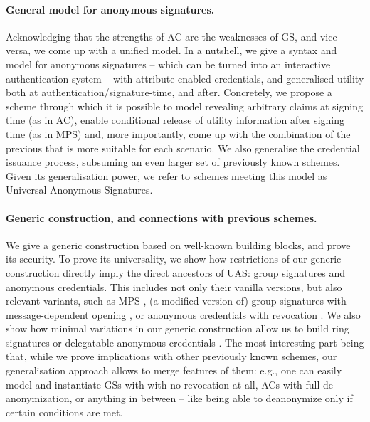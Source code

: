 \paragraph{General model for anonymous signatures.} %
Acknowledging that the strengths of AC are the weaknesses of GS, and vice versa,
we come up with a unified model. In a nutshell, we give a syntax and model for
anonymous signatures -- which can be turned into an interactive authentication
system -- with attribute-enabled credentials, and generalised utility both at
authentication/signature-time, and after. Concretely, we propose a scheme
through which it is possible to model revealing arbitrary claims at signing time
(as in AC), enable conditional release of utility information after signing time
(as in MPS) and, more importantly, come up with the combination of the previous
that is more suitable for each scenario. We also generalise the credential
issuance process, subsuming an even larger set of previously known schemes.
Given its generalisation power, we refer to schemes meeting this model as
Universal Anonymous Signatures.

\paragraph{Generic construction, and connections with previous schemes.} %
We give a generic construction based on well-known building blocks, and prove
its security. To prove its universality, we show how restrictions of our generic
construction directly imply the direct ancestors of UAS: group signatures and
anonymous credentials. This includes not only their vanilla versions, but also
relevant variants, such as MPS \needcite, (a modified version of) group
signatures with message-dependent opening \cite{seh+12}, or anonymous
credentials with revocation \cite{cks10}. We also show how minimal variations in
our generic construction allow us to build ring signatures \cite{rst06} or
delegatable anonymous credentials \cite{bcc+09}. The most interesting part being
that, while we prove implications with other previously known schemes, our
generalisation approach allows to merge features of them: e.g., one can easily
model and instantiate GSs with with no revocation at all, ACs with full
de-anonymization, or anything in between -- like being able to deanonymize only
if certain conditions are met.

